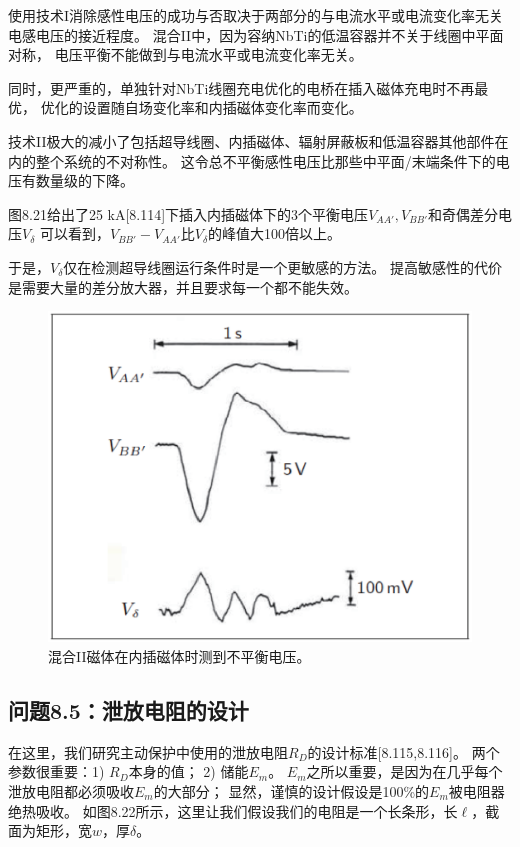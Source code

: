 使用技术I消除感性电压的成功与否取决于两部分的与电流水平或电流变化率无关电感电压的接近程度。
混合II中，因为容纳NbTi的低温容器并不关于线圈中平面对称，
电压平衡不能做到与电流水平或电流变化率无关。

同时，更严重的，单独针对NbTi线圈充电优化的电桥在插入磁体充电时不再最优，
优化的设置随自场变化率和内插磁体变化率而变化。

技术II极大的减小了包括超导线圈、内插磁体、辐射屏蔽板和低温容器其他部件在内的整个系统的不对称性。
这令总不平衡感性电压比那些中平面/末端条件下的电压有数量级的下降。

图8.21给出了25 kA[8.114]下插入内插磁体下的3个平衡电压$V_{AA'},V_{BB'}$和奇偶差分电压$V_{\delta}$
可以看到，$V_{BB'}-V_{AA'}$比$V_\delta$的峰值大100倍以上。

于是，$V_\delta$仅在检测超导线圈运行条件时是一个更敏感的方法。
提高敏感性的代价是需要大量的差分放大器，并且要求每一个都不能失效。

\begin{figure}
	\centering
	\includegraphics[scale=0.6]{chpt8/figs/fig8.21.eps}
	\caption{混合II磁体在内插磁体时测到不平衡电压。}
\end{figure}


\subsection{问题8.5：泄放电阻的设计}
在这里，我们研究主动保护中使用的泄放电阻$R_D$的设计标准[8.115,8.116]。
 两个参数很重要：1) $R_D$本身的值； 2) 储能$E_m$。
  $E_m$之所以重要，是因为在几乎每个泄放电阻都必须吸收$E_m$的大部分；
   显然，谨慎的设计假设是100\%的$E_m$被电阻器绝热吸收。 
   如图8.22所示，这里让我们假设我们的电阻是一个长条形，长$\ell$，截面为矩形，宽$w$，厚$\delta$。
   
